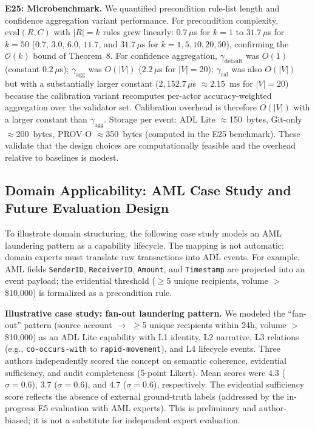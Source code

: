 \textbf{E25: Microbenchmark.} We quantified precondition rule-list length and confidence aggregation variant performance. For precondition complexity, $\text{eval}(R, C)$ with $|R| = k$ rules grew linearly: $0.7\,\mu$s for $k=1$ to $31.7\,\mu$s for $k=50$ ($0.7$, $3.0$, $6.0$, $11.7$, and $31.7\,\mu$s for $k = 1, 5, 10, 20, 50$), confirming the $\mathcal{O}(k)$ bound of Theorem~8. For confidence aggregation, $\gamma_{\text{default}}$ was $O(1)$ (constant $0.2\,\mu$s); $\gamma_{\text{agg}}$ was $O(|V|)$ ($2.2\,\mu$s for $|V|=20$); $\gamma_{\text{cal}}$ was also $O(|V|)$ but with a substantially larger constant ($2{,}152.7\,\mu$s $\approx 2.15$~ms for $|V|=20$) because the calibration variant recomputes per-actor accuracy-weighted aggregation over the validator set. Calibration overhead is therefore $O(|V|)$ with a larger constant than $\gamma_{\text{agg}}$. Storage per event: ADL Lite $\approx$150~bytes, Git-only $\approx$200~bytes, PROV-O $\approx$350~bytes (computed in the E25 benchmark). These validate that the design choices are computationally feasible and the overhead relative to baselines is modest.

\subsection{Domain Applicability: AML Case Study and Future Evaluation Design}\label{subsec:domain-applicability}

To illustrate domain structuring, the following case study models an AML laundering pattern as a capability lifecycle. The mapping is not automatic: domain experts must translate raw transactions into ADL events. For example, AML fields \texttt{SenderID}, \texttt{ReceiverID}, \texttt{Amount}, and \texttt{Timestamp} are projected into an event payload; the evidential threshold ($\geq$5 unique recipients, volume $>$ \$10,000) is formalized as a precondition rule.

\textbf{Illustrative case study: fan-out laundering pattern.} We modeled the ``fan-out'' pattern (source account $\rightarrow$ $\geq$5 unique recipients within 24h, volume $>$ \$10,000) as an ADL Lite capability with L1 identity, L2 narrative, L3 relations (e.g., \texttt{co-occurs-with} to \texttt{rapid-movement}), and L4 lifecycle events. Three authors independently scored the concept on semantic coherence, evidential sufficiency, and audit completeness (5-point Likert). Mean scores were $4.3$ ($\sigma = 0.6$), $3.7$ ($\sigma = 0.6$), and $4.7$ ($\sigma = 0.6$), respectively. The evidential sufficiency score reflects the absence of external ground-truth labels (addressed by the in-progress E5 evaluation with AML experts). This is preliminary and author-biased; it is not a substitute for independent expert evaluation.

